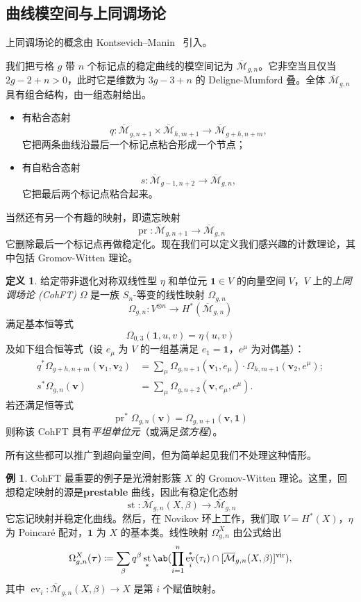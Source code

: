 \documentclass{amsart}
\theoremstyle{definition}
\newtheorem{defn}[thm]{定义}
\newtheorem{exm}[thm]{例}
\theoremstyle{remark}
\theoremstyle{plain}
\theoremstyle{definition}
\theoremstyle{remark}
\newcommand{\Mbar}{\overline{\mathcal{M}}}
\newcommand{\mbf}[1]{\mathbf{#1}}
\newcommand{\bv}{\mbf{v}}
\newcommand{\btau}{\bm{\tau}}
\newcommand{\mr}[1]{\mathrm{#1}}
\newcommand{\1}{\mathbf{1}}
\newcommand{\2}{\mathbf{2}}
\newcommand{\3}{\mathbf{3}}
\newcommand{\vir}{\mr{vir}}
\DeclareMathOperator{\ev}{ev}
\DeclareMathOperator{\st}{st}
\DeclareMathOperator{\pr}{pr}
\begin{document}
\subsection{曲线模空间与上同调场论}%
\label{sub:Moduli of curves and CohFTs}

上同调场论的概念由 Kontsevich--Manin~\cite{KM1994} 引入。

我们把亏格 \(g\) 带 \(n\) 个标记点的稳定曲线的模空间记为 $\Mbar_{g,n}$。它非空当且仅当 \(2g-2+n > 0\)，此时它是维数为 \(3g-3+n\) 的 Deligne-Mumford 叠。全体 \(\Mbar_{g,n}\) 具有组合结构，由一组态射给出。
\begin{itemize}
    \item 有粘合态射
        \[q \colon \Mbar_{g,n+1} \times \Mbar_{h, m+1} \to \Mbar_{g+h,n+m}, \]
        它把两条曲线沿最后一个标记点粘合形成一个节点；
    \item 有自粘合态射 \[s \colon \Mbar_{g-1,n+2} \to \Mbar_{g,n},\]
        它把最后两个标记点粘合起来。
\end{itemize}
当然还有另一个有趣的映射，即遗忘映射
\[ \pr \colon \Mbar_{g,n+1} \to \Mbar_{g,n} \]
它删除最后一个标记点再做稳定化。现在我们可以定义我们感兴趣的计数理论，其中包括 Gromov-Witten 理论。

\begin{defn}
    给定带非退化对称双线性型 \(\eta\) 和单位元 \(\1 \in V\) 的向量空间 \(V\)，\(V\) 上的\textit{上同调场论 (CohFT)} \(\Omega\) 是一族 \(S_n\)-等变的线性映射 \(\Omega_{g,n}\)
    \[ \Omega_{g,n} \colon V^{\otimes n} \to H^*(\Mbar_{g,n}) \]
    满足基本恒等式
    \[ \Omega_{0,3}(\1, u,v) = \eta(u,v) \]
    及如下组合恒等式（设 \(e_{\mu}\) 为 \(V\) 的一组基满足 \(e_1 = \1\)，\(e^{\mu}\) 为对偶基）：
    \begin{align*}
        q^* \Omega_{g+h,n+m}(\bv_1, \bv_2) &= \sum_{\mu} \Omega_{g,n+1}(\bv_1, e_{\mu}) \cdot \Omega_{h,m+1}(  \bv_2, e^{\mu} ); \\
        s^* \Omega_{g,n}(\bv) &= \sum_{\mu} \Omega_{g,n+2}(\bv, e_{\mu}, e^{\mu}).
    \end{align*}
    若还满足恒等式
    \[ \pr^*\Omega_{g,n}(\bv) = \Omega_{g,n+1}(\bv,\1) \]
    则称该 CohFT 具有\textit{平坦单位元}（或满足\textit{弦方程}）。
\end{defn}
所有这些都可以推广到超向量空间，但为简单起见我们不处理这种情形。

\begin{exm}
    CohFT 最重要的例子是光滑射影簇 \(X\) 的 Gromov-Witten 理论。这里，回想稳定映射的源是\textbf{prestable} 曲线，因此有稳定化态射
    \[ \st \colon \Mbar_{g,n}(X,\beta) \to \Mbar_{g,n} \]
    它忘记映射并稳定化曲线。然后，在 Novikov 环上工作，我们取 \(V = H^*(X)\)，\(\eta\) 为 Poincar\'e 配对，\(\1\) 为 \(X\) 的基本类。线性映射 \(\Omega^X_{g,n}\) 由公式给出
    \[ \Omega_{g,n}^X(\btau) \coloneqq \sum_{\beta} q^{\beta} \st_* \ab(\prod_{i=1}^n \ev_i^*(\tau_i) \cap [\Mbar_{g,n}(X,\beta)]^{\vir}), \]
    其中 \(\ev_i \colon \Mbar_{g,n}(X,\beta) \to X\) 是第 \(i\) 个赋值映射。
\end{exm}
\end{document}
